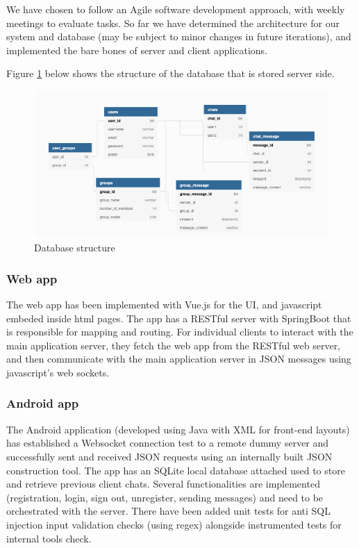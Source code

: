 We have chosen to follow an Agile software development approach, with weekly meetings to evaluate tasks. So far we have determined the architecture for our system and database (may be subject to minor changes in future iterations), and implemented the bare bones of server and client applications. 

Figure \ref{dbfig} below shows the structure of the database that is stored server side. 

\begin{figure}[h!]
\includegraphics[width=\linewidth]{db.png}
\caption{Database structure}
\label{dbfig}
\end{figure}

\subsubsection{Web app} 

 The web app has been implemented with Vue.js for the UI, and javascript embeded inside html pages. The app has a RESTful server with SpringBoot that is responsible for mapping and routing. For individual clients to interact with the main application server, they fetch the web app from the RESTful web server, and then communicate with the main application server in JSON messages using javascript's web sockets. 

\subsubsection{Android app}

The Android application (developed using Java with XML for front-end layouts) has established a Websocket connection test to a remote dummy server and successfully sent and received JSON requests using an internally built JSON construction tool. The app has an SQLite local database attached used to store and retrieve previous client chats. Several functionalities are implemented (registration, login, sign out, unregister, sending messages) and need to be orchestrated with the server. There have been added unit tests for anti SQL injection input validation checks (using regex) alongside instrumented tests for internal tools check.

